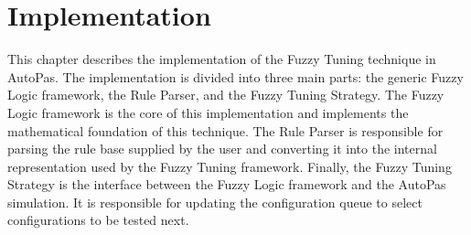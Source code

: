 \chapter{Implementation}
\label{sec:implementation}

\newcommand{\fuzzySetNodeOneD}[4]{
  \begin{tikzpicture}
    \begin{axis}%
      [
        axis line style={black},
        width=4.5cm,
        height=3cm,
        axis lines=center,
        xlabel={#1},
        x label style={at={(axis description cs:0.9,0.25)},anchor=north},
        ylabel=$\mu$,
        y label style={at={(axis description cs:0.5,1)},anchor=south},
        xmin=-6,
        xmax=6,
        ytick={},
        yticklabels={},
        extra x ticks={0},
        extra x tick labels={#3},
        ymax=1,
        samples=25,
        extra y ticks={1},
        every axis plot/.append style={thick}
      ]
      \addplot[red]  {#4};
    \end{axis}
    \node[above,font=\large\bfseries,inner sep=5pt] at (current bounding box.north) {\shortstack{FuzzySet\\#2}};
  \end{tikzpicture}
}

\newcommand{\fuzzySetNodeTwoD}[4]{
  \begin{tikzpicture}
    \begin{axis}%
      [
        width=5.5cm,
        height=4cm,
        axis lines=center,
        xlabel={#1},
        x label style={at={(axis description cs:0.1,0.4)},anchor=north},
        ylabel={#2},
        y label style={at={(axis description cs:0.4,-0.15)},anchor=south},
        zlabel=$\mu$,
        z label style={at={(axis description cs:0.5,0.95)},anchor=south},
        xmin=-6,
        xmax=6,
        colormap/viridis,
        view={10}{40},
        ymin=-6,
        ymax=6,
        zmin=0,
        zmax=1,
      ]
      \addplot3 [
        domain=-6:6,
        samples = 20,
        surf,
      ]{#4};
    \end{axis}
    \node[above,font=\large\bfseries,inner sep=5pt] at (current bounding box.north) { \shortstack{FuzzySet\\#3}};
  \end{tikzpicture}
}


This chapter describes the implementation of the Fuzzy Tuning technique in AutoPas. The implementation is divided into three main parts: the generic Fuzzy Logic framework, the Rule Parser, and the Fuzzy Tuning Strategy. The Fuzzy Logic framework is the core of this implementation and implements the mathematical foundation of this technique. The Rule Parser is responsible for parsing the rule base supplied by the user and converting it into the internal representation used by the Fuzzy Tuning framework. Finally, the Fuzzy Tuning Strategy is the interface between the Fuzzy Logic framework and the AutoPas simulation. It is responsible for updating the configuration queue to select configurations to be tested next.


